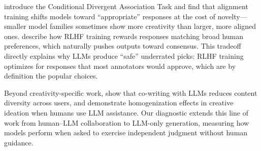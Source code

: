 \citet{beyond2026divergent} introduce the Conditional Divergent Association Task and find that alignment training shifts models toward ``appropriate'' responses at the cost of novelty---smaller model families sometimes show more creativity than larger, more aligned ones. \citet{ouyang2022training} describe how RLHF training rewards responses matching broad human preferences, which naturally pushes outputs toward consensus. This tradeoff directly explains why LLMs produce ``safe'' underrated picks: RLHF training optimizes for responses that most annotators would approve, which are by definition the popular choices.

Beyond creativity-specific work, \citet{padmakumar2024diversity} show that co-writing with LLMs reduces content diversity across users, and \citet{anderson2024homogenization} demonstrate homogenization effects in creative ideation when humans use LLM assistance. Our diagnostic extends this line of work from human--LLM collaboration to LLM-only generation, measuring how models perform when asked to exercise independent judgment without human guidance.
